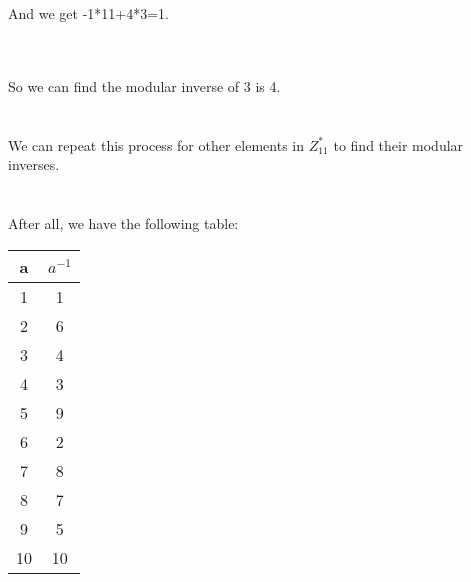 \documentclass{article}
\begin{document}
And we get -1*11+4*3=1.\\
\\ \hspace*{\fill} \\
\raggedright
So we can find the modular inverse of 3 is 4.\\
\\ \hspace*{\fill} \\
We can repeat this process for other elements in $Z^*_{11}$ to find their modular inverses.\\
\\ \hspace*{\fill} \\
After all, we have the following table:\\
\begin{table}[H]
\centering
\begin{tabular}{|c|c|}
\hline
a & $a^{-1}$\\
\hline
1 & 1\\
2 & 6\\
3 & 4\\
4 & 3\\
5 & 9\\
6 & 2\\
7 & 8\\
8 & 7\\
9 & 5\\
10 & 10\\
\hline
\end{tabular}
\end{table}

\\ \hspace*{\fill} \\
\end{document}
